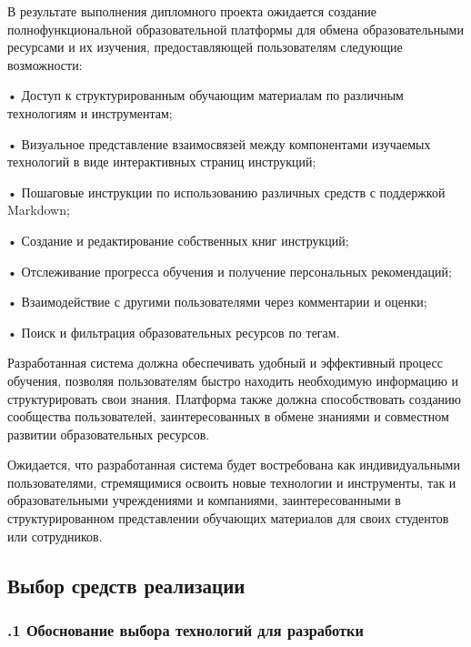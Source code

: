 {\gostFont

  \par \redline В результате выполнения дипломного проекта ожидается создание полнофункциональной образовательной платформы для обмена образовательными ресурсами и их изучения, предоставляющей пользователям следующие возможности:

  \par \redline • Доступ к структурированным обучающим материалам по различным технологиям и инструментам;
  \par \redline • Визуальное представление взаимосвязей между компонентами изучаемых технологий в виде интерактивных страниц инструкций;
  \par \redline • Пошаговые инструкции по использованию различных средств с поддержкой Markdown;
  \par \redline • Создание и редактирование собственных книг инструкций;
  \par \redline • Отслеживание прогресса обучения и получение персональных рекомендаций;
  \par \redline • Взаимодействие с другими пользователями через комментарии и оценки;
  \par \redline • Поиск и фильтрация образовательных ресурсов по тегам.

  \par \redline Разработанная система должна обеспечивать удобный и эффективный процесс обучения, позволяя пользователям быстро находить необходимую информацию и структурировать свои знания. Платформа также должна способствовать созданию сообщества пользователей, заинтересованных в обмене знаниями и совместном развитии образовательных ресурсов.

  \par \redline Ожидается, что разработанная система будет востребована как индивидуальными пользователями, стремящимися освоить новые технологии и инструменты, так и образовательными учреждениями и компаниями, заинтересованными в структурированном представлении обучающих материалов для своих студентов или сотрудников.

  \par
}

\subsection*{
  \gostTitleFont
   Выбор средств реализации
}

\titlespace

\subsubsection*{ 
  \gostTitleFont
  .1 Обоснование выбора технологий для разработки
} 

